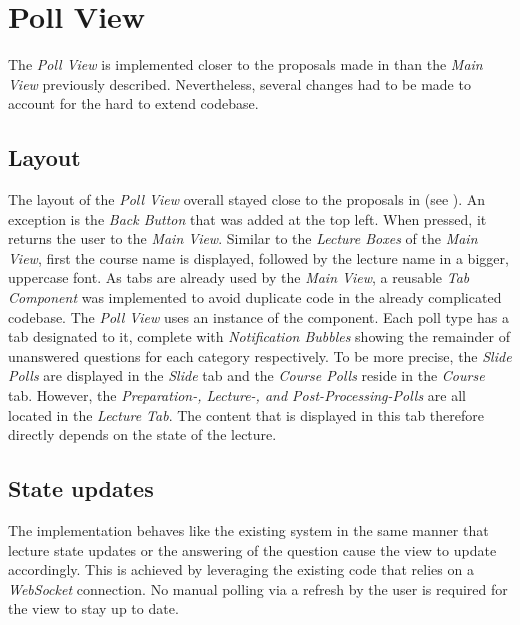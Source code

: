 \section{Poll View}
The \emph{Poll View} is implemented closer to the proposals made in  than the \emph{Main View} previously described. Nevertheless, several changes had to be made to account for the hard to extend codebase.    

\subsection{Layout}
The layout of the \emph{Poll View} overall stayed close to the proposals in  (see ). An exception is the \emph{Back Button} that was added at the top left. When pressed, it returns the user to the \emph{Main View}. Similar to the \emph{Lecture Boxes} of the \emph{Main View}, first the course name is displayed, followed by the lecture name in a bigger, uppercase font. 
As tabs are already used by the \emph{Main View}, a reusable \emph{Tab Component} was implemented to avoid duplicate code in the already complicated codebase. The \emph{Poll View} uses an instance of the component. Each poll type has a tab designated to it, complete with \emph{Notification Bubbles} showing the remainder of unanswered questions for each category respectively. To be more precise, the \emph{Slide Polls} are displayed in the \emph{Slide} tab and the \emph{Course Polls} reside in the \emph{Course} tab.
However, the \emph{Preparation-, Lecture-, and Post-Processing-Polls} are all located in the \emph{Lecture Tab}. The content that is displayed in this tab therefore directly depends on the state of the lecture.

\subsection{State updates}
The implementation behaves like the existing system in the same manner that lecture state updates or the answering of the question cause the view to update accordingly. This is achieved by leveraging the existing code that relies on a \emph{WebSocket} connection. No manual polling via a refresh by the user is required for the view to stay up to date.

